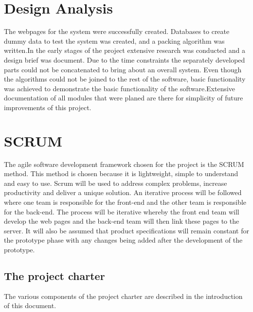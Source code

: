 \documentclass[paper=a4, fontsize=11pt]{scrartcl} %
\numberwithin{equation}{section} %
\numberwithin{figure}{section} %
\numberwithin{table}{section} %
\begin{document}
\section{Design Analysis}
The webpages for the system were successfully created. Databases to create dummy data to test the system was created, and a packing algorithm was written.In the early stages of the project extensive research was conducted and a design brief was document. Due to the time constraints the separately developed parts could not be concatenated to bring about an overall system. Even though the algorithms could not be joined to the rest of the software, basic functionality was achieved to demonstrate the basic functionality of the software.Extensive documentation of all modules that were planed are there for simplicity of future improvements of this project.

\newpage
\section{SCRUM}

The agile software development framework chosen for the project is the SCRUM method. This method is chosen because it is lightweight, simple to understand and easy to use. Scrum will be used to address complex problems, increase productivity and deliver a unique solution. An iterative process will be followed where one team is responsible for the front-end and the other team is responsible for the back-end. The process will be iterative whereby the front end team will develop the web pages and the back-end team will then link these pages to the server. It will also be assumed that product specifications will remain constant for the prototype phase with any changes being added after the development of the prototype.

\subsection{The project charter}
The various components of the project charter are described in the introduction of this document.
\end{document}
